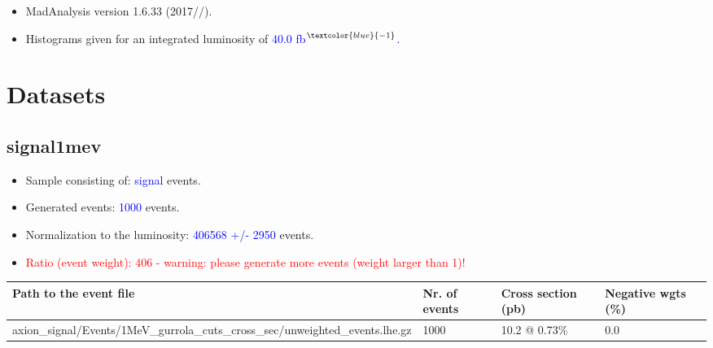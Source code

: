 \documentclass[a4paper, 10pt]{article}
\begin{document}
\begin{itemize}
  \item MadAnalysis version 1.6.33 (2017//).
   \item Histograms given for an integrated luminosity of \textcolor{blue}{40.0}\textcolor{blue}{ fb}$^{\textcolor{blue}{-1}}$\textcolor{blue}{.}
\textcolor{blue}{}
\end{itemize}
\newpage
\section{ Datasets}

\subsection{ signal1mev}

\begin{itemize}
  \item Sample consisting of: \textcolor{blue}{signal}  events.
   \item Generated events: \textcolor{blue}{1000 }  events.
   \item Normalization to the luminosity: \textcolor{blue}{406568}\textcolor{blue}{ +/\-- }\textcolor{blue}{2950 }  events.
   \item\textcolor{red}{Ratio (event weight): }\textcolor{red}{406 }\textcolor{red}{ - warning: please generate more events (weight larger than 1)!}
\textcolor{red}{}
\end{itemize}
\begin{table}[H]
  \begin{center}
    \begin{tabular}{|m{55.0mm}|m{25.0mm}|m{30.0mm}|m{30.0mm}|}
      \hline
      {\cellcolor{yellow}         Path to the event file}& {\cellcolor{yellow}         Nr. of events}& {\cellcolor{yellow}         Cross section (pb)}& {\cellcolor{yellow}         Negative wgts (\%)}\\
      \hline
      {\cellcolor{white}          axion\_signal/\-Events/\-1MeV\_gurrola\_cuts\_cross\_sec/\-unweighted\_events.lhe.gz}& {\cellcolor{white}          1000}& {\cellcolor{white}          10.2 @ 0.73\%}& {\cellcolor{white}          0.0}\\
\hline
    \end{tabular}
  \end{center}
\end{table}
\end{document}
